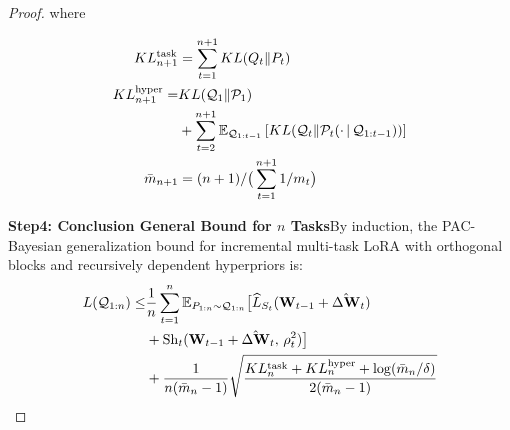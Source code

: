\documentclass[letterpaper]{article} %
\begin{document}
\begin{proof}
where

\begin{equation}
    \begin{aligned}
        KL_{n+1}^{\text{task}} &= \sum_{t=1}^{n+1} KL(Q_t\|P_t)\\
        KL_{n+1}^{\text{hyper}} = & KL(\mathcal{Q}_1\|\mathcal{P}_1)  \\
        &+\sum_{t=2}^{n+1} \mathbb{E}_{\mathcal{Q}_{1:t-1}}
        \left[ KL(\mathcal{Q}_t \| \mathcal{P}_t(\cdot\,|\,\mathcal{Q}_{1:t-1})) \right] \\
        \bar{m}_{n+1} &= (n+1)/\big(\sum_{t=1}^{n+1} 1/m_t\big) \notag
    \end{aligned}
\end{equation}
    

\textbf{Step4: Conclusion General Bound for $n$ Tasks}By induction, the PAC-Bayesian generalization bound for incremental multi-task LoRA with orthogonal blocks and recursively dependent hyperpriors is:
\begin{equation}
    \begin{aligned}
        L(\mathcal{Q}_{1:n}) \leq & \frac{1}{n} \sum_{t=1}^{n}
        \mathbb{E}_{P_{1:n} \sim \mathcal{Q}_{1:n}}\big[
            \widehat{L}_{S_t}(\mathbf{W}_{t-1} + \hat{\Delta\mathbf{W}}_t) \notag\\
        & + \mathrm{Sh}_t(\mathbf{W}_{t-1} + \hat{\Delta\mathbf{W}}_t,\, \rho_t^2)
        \big] \notag\\
        & + \frac{1 }{n(\bar{m}_n - 1)}\sqrt{
            \frac{KL_{n}^{\text{task}} + KL_{n}^{\text{hyper}} +\log(\bar{m}_{n}/\delta)}{2(\bar{m}_{n} - 1)}
        } \notag
\end{aligned}
\end{equation}


\end{proof}
\end{document}
